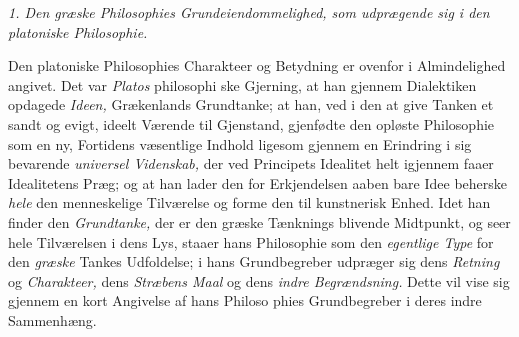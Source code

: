 \divrule
%
\begin{center}
\emph{1. Den græske Philosophies Grundeiendommelighed, som udprægende sig i den
platoniske Philosophie.}
\end{center}
Den platoniske Philosophies Charakteer og Betydning er
ovenfor i Almindelighed angivet. Det var \emph{Platos} philosophi\-%
ske Gjerning, at han gjennem Dialektiken opdagede \emph{Ideen,}
Grækenlands Grundtanke; at han, ved i den at give Tanken
et sandt og evigt, ideelt Værende til Gjenstand, gjenfødte den
opløste Philosophie som en ny, Fortidens væsentlige Indhold
ligesom gjennem en Erindring i sig bevarende \emph{universel
Videnskab,} der ved Principets Idealitet helt igjennem faaer
Idealitetens Præg; og at han lader den for Erkjendelsen aaben\-%
bare Idee beherske \emph{hele} den menneskelige Tilværelse og forme
den til kunstnerisk Enhed. Idet han finder den \emph{Grundtanke,}
der er den græske Tænknings blivende Midtpunkt, og seer
hele Tilværelsen i dens Lys, staaer hans Philosophie som den
\emph{egentlige Type} for den \emph{græske} Tankes Udfoldelse; i hans
Grundbegreber udpræger sig dens \emph{Retning} og \emph{Charakteer,}
dens \emph{Stræbens Maal} og dens \emph{indre Begrændsning.}
Dette vil vise sig gjennem en kort Angivelse af hans Philoso\-%
phies Grundbegreber i deres indre Sammenhæng.

